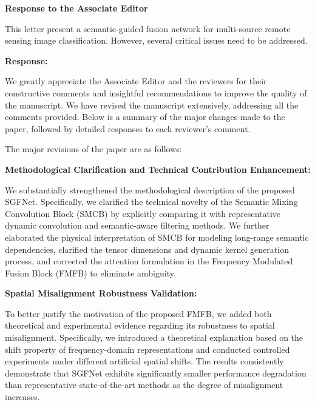 \label{re:editor}

\begin{center}
  \large\bf Response to the Associate Editor
\end{center}

\begin{tcolorbox}[title={Overall Comment}]
  \vspace{1em}

  \color{blue}
  This letter present a semantic-guided fusion network for multi-source remote sensing image classification. However, several critical issues need to be addressed.

  \vspace{1em}
\end{tcolorbox}

\textbf{Response:}

We greatly appreciate the Associate Editor and the reviewers for their constructive comments and insightful recommendations to improve the quality of the manuscript. We have revised the manuscript extensively, addressing all the comments provided. Below is a summary of the major changes made to the paper, followed by detailed responses to each reviewer’s comment.

The major revisions of the paper are as follows:

\textbf{Methodological Clarification and Technical Contribution Enhancement:}

We substantially strengthened the methodological description of the proposed SGFNet. Specifically, we clarified the technical novelty of the Semantic Mixing Convolution Block (SMCB) by explicitly comparing it with representative dynamic convolution and semantic-aware filtering methods. We further elaborated the physical interpretation of SMCB for modeling long-range semantic dependencies, clarified the tensor dimensions and dynamic kernel generation process, and corrected the attention formulation in the Frequency Modulated Fusion Block (FMFB) to eliminate ambiguity.

\textbf{Spatial Misalignment Robustness Validation:}

To better justify the motivation of the proposed FMFB, we added both theoretical and experimental evidence regarding its robustness to spatial misalignment. Specifically, we introduced a theoretical explanation based on the shift property of frequency-domain representations and conducted controlled experiments under different artificial spatial shifts. The results consistently demonstrate that SGFNet exhibits significantly smaller performance degradation than representative state-of-the-art methods as the degree of misalignment increases.

